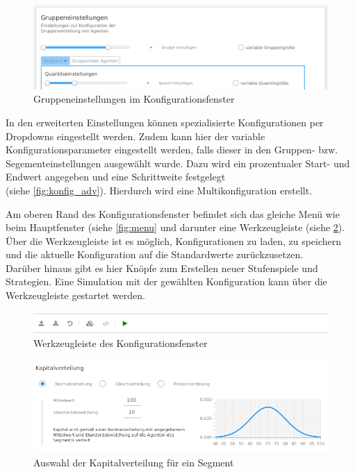 \documentclass[parskip=full,11pt]{scrartcl}
\begin{document}
\begin{figure}[ht]
	\centering
	\includegraphics[width=\textwidth]{images/konfig_group.png}
	\caption{\label{fig:konfig_group}
		Gruppeneinstellungen im Konfigurationsfenster}
\end{figure}


In den erweiterten Einstellungen können spezialisierte Konfigurationen per Dropdowns eingestellt werden. Zudem kann hier der variable Konfigurationsparameter eingestellt werden, falls dieser in den Gruppen- bzw. Segementeinstellungen ausgewählt wurde. Dazu wird ein prozentualer Start- und Endwert angegeben und eine Schrittweite festgelegt \\(siehe \cref{fig:konfig_adv}). Hierdurch wird eine Multikonfiguration erstellt.


\newpage
Am oberen Rand des Konfigurationsfenster befindet sich das gleiche Menü wie beim Hauptfenster (siehe \cref{fig:menu} und darunter eine Werkzeugleiste (siehe \cref{fig:konfig_tool}). Über die Werkzeugleiste ist es möglich, Konfigurationen zu laden, zu speichern und die aktuelle Konfiguration auf die Standardwerte zurückzusetzen.\\Darüber hinaus gibt es hier Knöpfe zum Erstellen neuer Stufenspiele und Strategien. Eine Simulation mit der gewählten Konfiguration kann über die Werkzeugleiste gestartet werden.

\begin{figure}[ht]
	\centering
	\includegraphics[width=\textwidth]{images/konfig_tool.png}
	\caption{\label{fig:konfig_tool}
		Werkzeugleiste des Konfigurationsfenster}
\end{figure}

\begin{figure}[hb]
	\centering
	\includegraphics[width=\textwidth]{images/konfig_cap.png}
	\caption{\label{fig:konfig_cap}
		Auswahl der Kapitalverteilung für ein Segment}
\end{figure}
\end{document}
